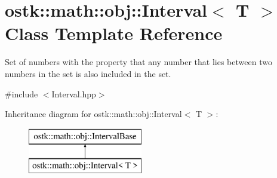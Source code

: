 \hypertarget{classostk_1_1math_1_1obj_1_1_interval}{}\section{ostk\+:\+:math\+:\+:obj\+:\+:Interval$<$ T $>$ Class Template Reference}
\label{classostk_1_1math_1_1obj_1_1_interval}


Set of numbers with the property that any number that lies between two numbers in the set is also included in the set.  




{\ttfamily \#include $<$Interval.\+hpp$>$}

Inheritance diagram for ostk\+:\+:math\+:\+:obj\+:\+:Interval$<$ T $>$\+:\begin{figure}[H]
\begin{center}
\leavevmode
\includegraphics[height=2.000000cm]{classostk_1_1math_1_1obj_1_1_interval}
\end{center}
\end{figure}
